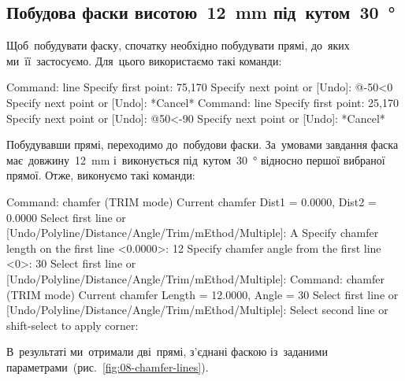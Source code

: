 \documentclass[
	a4paper,
	oneside,
	BCOR = 10mm,
	DIV = 12,
	12pt,
	headings = normal,
]{scrartcl}
\begin{document}
		\subsection{Побудова фаски висотою~\SI{12}{\milli\metre} під~кутом~\SI{30}{\degree}}
			Щоб~побудувати фаску, спочатку необхідно побудувати прямі, до~яких ми~її~застосуємо. Для~цього використаємо такі команди:
			\begin{codegeneric}
				Command: line
				Specify first point: 75,170
				Specify next point or [Undo]: @-50<0
				Specify next point or [Undo]: *Cancel*
				Command: line
				Specify first point: 25,170
				Specify next point or [Undo]: @50<-90
				Specify next point or [Undo]: *Cancel*
			\end{codegeneric}
			Побудувавши прямі, переходимо до~побудови фаски. За~умовами завдання фаска має~довжину~\SI{12}{\milli\metre} і~виконується під~кутом~\SI{30}{\degree} відносно першої вибраної прямої. Отже, виконуємо такі команди:
			\begin{codegeneric}
				Command: chamfer
				(TRIM mode) Current chamfer Dist1 = 0.0000, Dist2 = 0.0000
				Select first line or [Undo/Polyline/Distance/Angle/Trim/mEthod/Multiple]: A
				Specify chamfer length on the first line <0.0000>: 12
				Specify chamfer angle from the first line <0>: 30
				Select first line or [Undo/Polyline/Distance/Angle/Trim/mEthod/Multiple]:
				Command: chamfer
				(TRIM mode) Current chamfer Length = 12.0000, Angle = 30
				Select first line or [Undo/Polyline/Distance/Angle/Trim/mEthod/Multiple]:
				Select second line or shift-select to apply corner:
			\end{codegeneric}
			В~результаті ми~отримали дві~прямі, з'єднані фаскою із~заданими параметрами~(рис.~\ref{fig:08-chamfer-lines}).
\end{document}
